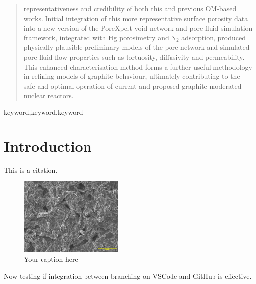 \documentclass[3p,twocolumn]{elsarticle}
\begin{document}
\begin{frontmatter}
\begin{abstract}
representativeness and credibility of both this and previous OM-based works.
Initial integration of this more representative surface porosity data into a new
version of the PoreXpert void network and pore fluid simulation framework,
integrated with Hg porosimetry and N$_2$ adsorption, produced physically
plausible preliminary models of the pore network and simulated pore-fluid flow
properties such as tortuosity, diffusivity and permeability.  This enhanced
characterisation method forms a further useful methodology in refining models of
graphite behaviour, ultimately contributing to the safe and optimal operation of
current and proposed graphite-moderated nuclear reactors.\end{abstract}
\begin{keyword}keyword\sep keyword\sep keyword\end{keyword}
\end{frontmatter}

\section{Introduction}
This is a citation.\cite{JONES2020256HgHe}



\begin{figure}[ht]
    \includegraphics[width=0.45\textwidth]{./Media/image.png}
    \caption{Your caption here}
    \label{fig:testimage1}
\end{figure}
Now testing if integration between branching on VSCode and GitHub is effective.


\end{document}
